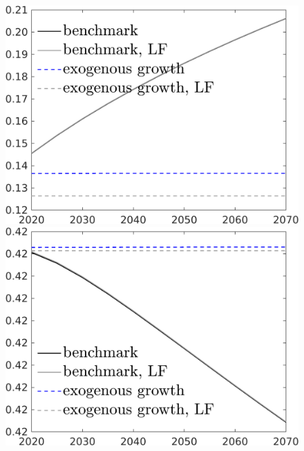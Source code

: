 \begin{figure}[h!!]
\begin{minipage}[]{0.32\textwidth}
 	\end{minipage}
 	\begin{minipage}[]{0.32\textwidth}
 		\includegraphics[width=1\textwidth]{../../codding_model/own_basedOnFried/optimalPol_190722_tidiedUp/figures/all_10Aout22/CountXgrTaulLF_target_GFF_spillover0_sep1_extern0_PV1_etaa0.79_lgd1.png}
 	\end{minipage}
 	\begin{minipage}[]{0.32\textwidth}
 		\includegraphics[width=1\textwidth]{../../codding_model/own_basedOnFried/optimalPol_190722_tidiedUp/figures/all_10Aout22/CountXgrTaulLF_target_EY_spillover0_sep1_extern0_PV1_etaa0.79_lgd1.png}

\end{minipage}
\end{figure}
